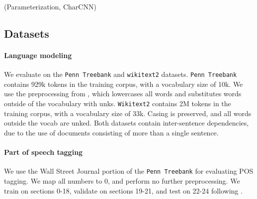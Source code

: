 \documentclass[11pt,a4paper]{article}
\begin{document}
(Parameterization, CharCNN)

\subsection{Datasets}
\paragraph{Language modeling}
We evaluate on the \texttt{Penn Treebank} \citep{ptb}
and \texttt{wikitext2} \citep{wikitext} datasets.
\texttt{Penn Treebank} contains 929k tokens in the training corpus,
with a vocabulary size of 10k.
We use the preprocessing from \citet{mikolov-2011},
which lowercases all words and substitutes words outside of the vocabulary
with unks. 
\texttt{Wikitext2} contains 2M tokens in the training corpus,
with a vocabulary size of 33k.
Casing is preserved, and all words outside the vocab are unked.
Both datasets contain inter-sentence dependencies,
due to the use of documents consisting of more than a single sentence.

\paragraph{Part of speech tagging}
We use the Wall Street Journal portion of the \texttt{Penn Treebank}
for evaluating POS tagging.
We map all numbers to 0, and perform no further preprocessing.
We train on sections 0-18, validate on sections 19-21, and test on 22-24
following \citet{ma2016crf}.


\begin{comment}
\paragraph{Implementation}
We train two-layer LSTM recurrent neural networks with 256 units,
as well as two-layer feed-forward neural networks with 256 units.
The HMMs we train follow the sparsity constraints outlined in the previous
section with a dropout rate of 0.5,
and we vary the total number of states as well as states per word.
We optimize all models with AdamW \citep{adamw}.

We experimented with a couple batching strategies:
On \texttt{Penn Treebank},
the first strategy discarded the inter-sentence dependencies and shuffled all sentences,
and the second treated the corpus as a single flat document without shuffling.
On \texttt{Wikitext2}, we either shuffled at the document level or treated the corpus as a
single document.
Prior work on both corpuses treated the corpora as single documents.

See Appendix \ref{sec:hyperparams} for the hyperparameters for all models.
\end{comment}
\end{document}
